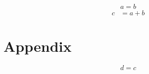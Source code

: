 \documentclass{article}
\begin{document}
\begin{equation}
a = b
\label{eq:def}
\end{equation}
\begin{align}
c &= a+b
\end{align}
\appendix
\section{Appendix}
\begin{equation}
d = c
\end{equation}
\end{document}
